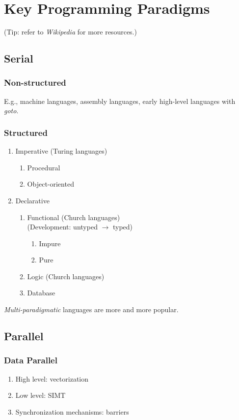 \documentclass{article}
\begin{document}
\appendix
\section{Key Programming Paradigms}
(Tip: refer to \emph{Wikipedia} for more resources.)
\subsection{Serial}
\subsubsection{Non-structured}
E.g., machine languages, assembly languages, early high-level languages with \emph{goto}.
\subsubsection{Structured}
\begin{enumerate}
    \item Imperative
    (Turing languages)
    \begin{enumerate}
        \item Procedural
        \item Object-oriented
    \end{enumerate}
    \item Declarative
    \begin{enumerate}
        \item Functional
        (Church languages)\\
        (Development: untyped $\rightarrow$ typed)
        \begin{enumerate}
            \item Impure
            \item Pure
        \end{enumerate}
        \item Logic
        (Church languages)
        \item Database
    \end{enumerate}
\end{enumerate}
\emph{Multi-paradigmatic} languages are more and more popular.
\subsection{Parallel}
\subsubsection{Data Parallel}
\begin{enumerate}
    \item High level: vectorization
    \item Low level: SIMT
    \item Synchronization mechanisms: barriers
\end{enumerate}
\end{document}
